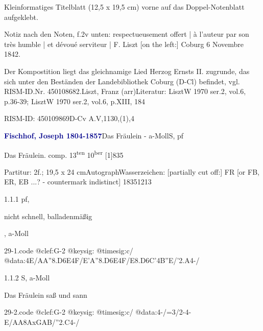 \documentclass[a4paper, twocolumn, 11pt]{book}
\begin{document}
\newline %
\par Kleinformatiges Titelblatt (12,5 x 19,5 cm) vorne auf das Doppel-Notenblatt aufgeklebt.
\par Notiz nach den Noten, f.2v unten: {\textquotedbl}respectueusement offert | à l'auteur par son très humble | et dévoué serviteur | F. Liszt [on the left:] Coburg 6 Novembre 1842.{\textquotedbl}
\par Der Kompostition liegt das gleichnamige Lied Herzog Ernsts II. zugrunde, das sich unter den Beständen der Landebibliothek Coburg (D-Cl) befindet, vgl. RISM-ID.Nr. 450108682.\newline Liszt, Franz  (arr)\newline Literatur: LisztW 1970  ser.2, vol.6, p.36-39; LisztW 1970  ser.2, vol.6, p.XIII, 184
\par RISM-ID: 450109869\newline D-Cv  A.V,1130,(1),4
\par \vspace{16pt} \textcolor{darkblue}{\textbf{Fischhof, Joseph  1804-1857}}\hfillplus{[29]}\newline Das Fräulein - a-Moll\newline S, pf
\par \begin{itshape} Das Fräulein. comp. 13\textsuperscript{t}\textsuperscript{e}\textsuperscript{n} 10\textsuperscript{b}\textsuperscript{e}\textsuperscript{r} [1]835\end{itshape} 
\par \textcolor{darkblue}{}  Partitur: 2f.; 19,5 x 24 cm\newline Autograph\newline Wasserzeichen: [partially cut off:] FR [or FB, ER, EB ...? - countermark indistinct]  18351213
\par 1.1.1  pf, \begin{itshape}nicht schnell, balladenmäßig\end{itshape}, a-Moll  
\begin{filecontents*}{29-1.code}
@clef:G-2
@keysig:
@timesig:c/
@data:4E/AA''{8.D6E}4F/E'A''{8.D6E}4F/E{8.D6C}'4B''E/'2.A4-/
\end{filecontents*}

\newline %
\par 1.1.2  S, a-Moll\newline \begin{footnotesize} Das Fräulein saß und sann \end{footnotesize}  
\begin{filecontents*}{29-2.code}
@clef:G-2
@keysig:
@timesig:c/
@data:4-/=3/2-4-E/AA{8AxG}{AB}/''2.C4-/
\end{filecontents*}
\end{document}
